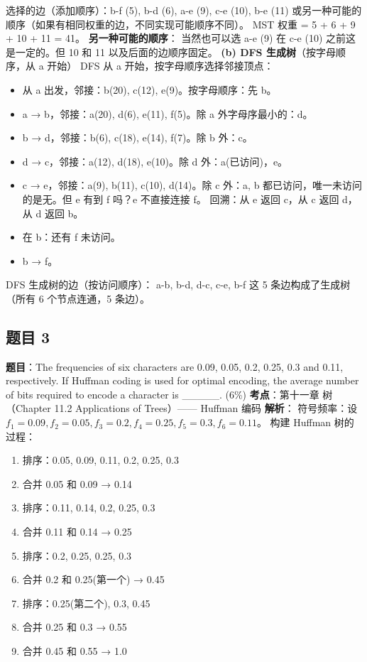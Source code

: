 \documentclass[10pt,a4paper,openany]{ctexbook}
\theoremstyle{definition}
\theoremstyle{remark}
\begin{document}
选择的边（添加顺序）：b-f (5), b-d (6), a-e (9), c-e (10), b-e (11)
或另一种可能的顺序（如果有相同权重的边，不同实现可能顺序不同）。
MST 权重 = 5 + 6 + 9 + 10 + 11 = 41。
\textbf{另一种可能的顺序}：
当然也可以选 a-e (9) 在 c-e (10) 之前这是一定的。但 10 和 11 以及后面的边顺序固定。
\textbf{(b) DFS 生成树}（按字母顺序，从 a 开始）
DFS 从 a 开始，按字母顺序选择邻接顶点：
\begin{itemize}
\item 从 a 出发，邻接：b(20), c(12), e(9)。按字母顺序：先 b。
\item a → b，邻接：a(20), d(6), e(11), f(5)。除 a 外字母序最小的：d。
\item b → d，邻接：b(6), c(18), e(14), f(7)。除 b 外：c。
\item d → c，邻接：a(12), d(18), e(10)。除 d 外：a(已访问)，e。
\item c → e，邻接：a(9), b(11), c(10), d(14)。除 c 外：a, b 都已访问，唯一未访问的是无。但 e 有到 f 吗？e 不直接连接 f。
回溯：从 e 返回 c，从 c 返回 d，从 d 返回 b。

\item 在 b：还有 f 未访问。
\item b → f。

\end{itemize}

DFS 生成树的边（按访问顺序）：
a-b, b-d, d-c, c-e, b-f
这 5 条边构成了生成树（所有 6 个节点连通，5 条边）。
\vspace{-2pt}

\subsection{题目 3}

\textbf{题目}：The frequencies of six characters are 0.09, 0.05, 0.2, 0.25, 0.3 and 0.11, respectively. If Huffman coding is used for optimal encoding, the average number of bits required to encode a character is \_\_\_\_\_. (6\%)
\textbf{考点}：第十一章 树（Chapter 11.2 Applications of Trees）—— Huffman 编码
\textbf{解析}：
符号频率：设 $f_1=0.09, f_2=0.05, f_3=0.2, f_4=0.25, f_5=0.3, f_6=0.11$。
构建 Huffman 树的过程：
\begin{enumerate}
\item 排序：0.05, 0.09, 0.11, 0.2, 0.25, 0.3
\item 合并 0.05 和 0.09 → 0.14
\item 排序：0.11, 0.14, 0.2, 0.25, 0.3
\item 合并 0.11 和 0.14 → 0.25
\item 排序：0.2, 0.25, 0.25, 0.3
\item 合并 0.2 和 0.25(第一个) → 0.45
\item 排序：0.25(第二个), 0.3, 0.45
\item 合并 0.25 和 0.3 → 0.55
\item 合并 0.45 和 0.55 → 1.0

\end{enumerate}
\end{document}
